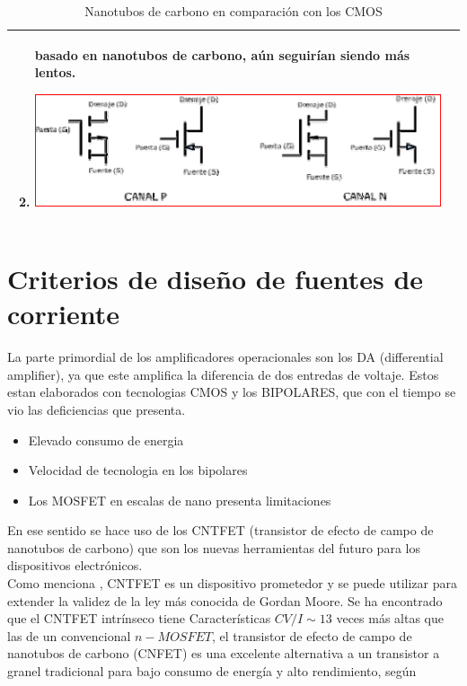 \documentclass[conference]{IEEEtran} %
\begin{document}
\begin{table}
\begin{tabular}{|p{}|p{}|}
\begin{enumerate}
				basado en nanotubos de carbono, aún seguirían siendo más lentos. 
				\vspace{3mm}
				\item[] \hspace*{10mm}\includegraphics[scale=0.3]{IMAGENES/2.png}
			\end{enumerate}\\
			\hline
		\end{tabular}
		\caption{Nanotubos de carbono en comparación con los CMOS}
	\end{table}


\section{Criterios de diseño de fuentes de corriente}
	La parte primordial de los amplificadores operacionales son los DA (differential amplifier), ya que este amplifica la diferencia de dos entredas de voltaje. Estos estan elaborados con tecnologias CMOS y los BIPOLARES, que con el tiempo se vio las deficiencias que presenta.
	\begin{itemize}
		\item Elevado consumo de energia
		\item Velocidad de tecnologia en los bipolares
		\item Los MOSFET en escalas de nano presenta limitaciones
	\end{itemize}
	En ese sentido se hace uso de los CNTFET (transistor de efecto de campo de nanotubos de carbono) que son los nuevas herramientas del futuro para los dispositivos electrónicos.\\
	Como menciona \cite{Akhoon}, CNTFET es un dispositivo prometedor y se puede utilizar para extender la validez de la ley más conocida de Gordan Moore. Se ha encontrado que el CNTFET intrínseco tiene Características $CV/I \sim 13$ veces más altas que las de un convencional $n-MOSFET$, el transistor de efecto de campo de nanotubos de carbono (CNFET) es una excelente alternativa a un transistor a granel tradicional para bajo consumo de energía y alto rendimiento, según \cite{Liu}
\end{document}
